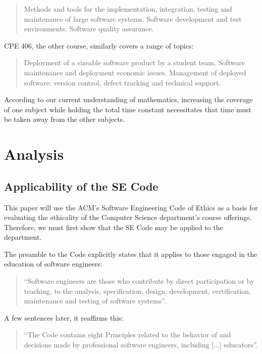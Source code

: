 \documentclass[11pt]{article}
\begin{document}
\begin{multicols}{2}
\begin{quote}
Methods and tools for the implementation, integration, testing and maintenance of large software systems. Software development and test environments. Software quality assurance. \cite{catalogCourses}
\end{quote}

CPE 406, the other course, similarly covers a range of topics:

\begin{quote}
Deployment of a sizeable software product by a student team. Software maintenance and deployment economic issues. Management of deployed software: version control, defect tracking and technical support. \cite{catalogCourses}
\end{quote}

According to our current understanding of mathematics, increasing the coverage of one subject while holding the total time constant necessitates that time must be taken away from the other subjects.

\section{Analysis}

\subsection{Applicability of the SE Code}

This paper will use the ACM's Software Engineering Code of Ethics as a basis for evaluating the ethicality of the Computer Science department's course offerings.  Therefore, we must first show that the SE Code may be applied to the department.

The preamble to the Code explicitly states that it applies to those engaged in the education of software engineers:

\begin{quote}
``Software engineers are those who contribute by direct participation or by teaching, to the analysis, specification, design, development, certification, maintenance and testing of software systems''. \cite{secode}
\end{quote}

A few sentences later, it reaffirms this:

\begin{quote}
``The Code contains eight Principles related to the behavior of and decisions made by professional software engineers, including [...] educators''. \cite{secode}
\end{quote}


\end{multicols}
\end{document}
